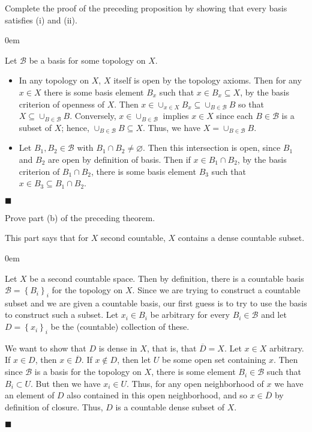\documentclass[12pt]{article}
\renewcommand{\qed}{\hfill$\blacksquare$}
\renewenvironment{proof}{\begin{addmargin}[1em]{0em}\begin{newproof}}{\end{newproof}\end{addmargin}\qed}
\newenvironment{exercise}[2][Exercise]{\begin{trivlist}
\item[\hskip \labelsep {\bfseries #1}\hskip \labelsep {\bfseries #2.}]}{\end{trivlist}}
\begin{document}
\begin{exercise}{2.45}
	Complete the proof of the preceding proposition by showing that every basis satisfies (i) and (ii).
\end{exercise}
\begin{proof}
Let $\mathcal{B}$ be a basis for some topology on $X$.
\begin{itemize}
	\item In any topology on $X$, $X$ itself is open by the topology axioms. Then for any $x\in X$ there is some basis element $B_x$ such that $x\in B_x \subseteq X$, by the basis criterion of openness of $X$. Then $x\in \cup_{x \in X}B_x \subseteq \cup_{B\in \mathcal{B}} B$ so that $X \subseteq \cup_{B\in \mathcal{B}} B$. Conversely, $x \in \cup_{B\in \mathcal{B}}$ implies $x\in X$ since each $B\in \mathcal{B}$ is a subset of $X$; hence, $\cup_{B\in \mathcal{B}} B \subseteq X$. Thus, we have $X = \cup_{B\in \mathcal{B}} B$.
	\item Let $B_1,B_2 \in \mathcal{B}$ with $B_1 \cap B_2 \neq \varnothing$. Then this intersection is open, since $B_1$ and $B_2$ are open by definition of basis. Then if $x \in B_1 \cap B_2$, by the basis criterion of $B_1 \cap B_2$, there is some basis element $B_3$ such that $x \in B_3 \subseteq B_1\cap B_2$.
\end{itemize}
\end{proof}





\begin{exercise}{2.51}
	Prove part (b) of the preceding theorem.
\end{exercise}
This part says that for $X$ second countable, $X$ contains a dense countable subset.\\

\begin{proof}
Let $X$ be a second countable space. Then by definition, there is a countable basis $\mathcal{B}=\left\{B_i\right\}_{i}$ for the topology on $X$. Since we are trying to construct a countable subset and we are given a countable basis, our first guess is to try to use the basis to construct such a subset. Let $x_i \in B_i$ be arbitrary for every $B_i \in \mathcal{B}$ and let $D=\left\{x_i\right\}_i$ be the (countable) collection of these.

We want to show that $D$ is dense in $X$, that is, that $\overline{D}=X$. Let $x\in X$ arbitrary. If $x \in D$, then $x\in \overline{D}$. If $x\notin D$, then let $U$ be some open set containing $x$. Then since $\mathcal{B}$ is a basis for the topology on $X$, there is some element $B_i\in \mathcal{B}$ such that $B_i\subset U$. But then we have $x_i \in U$. Thus, for any open neighborhood of $x$ we have an element of $D$ also contained in this open neighborhood, and so $x\in \overline{D}$ by definition of closure. Thus, $D$ is a countable dense subset of $X$.
\end{proof}
\end{document}
